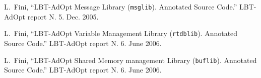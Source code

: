 \begin{references}


 L.~Fini, ``LBT-AdOpt Message Library ({\tt msglib}).   Annotated Source Code.'' LBT-AdOpt report N. 5. Dec. 2005.

 L.~Fini, ``LBT-AdOpt Variable Management Library ({\tt rtdblib}).   Annotated Source Code.'' LBT-AdOpt report N. 6. June 2006.

 L.~Fini, ``LBT-AdOpt Shared Memory management Library ({\tt buflib}).   Annotated Source Code.'' LBT-AdOpt report N. 6. June 2006.

\end{references}
